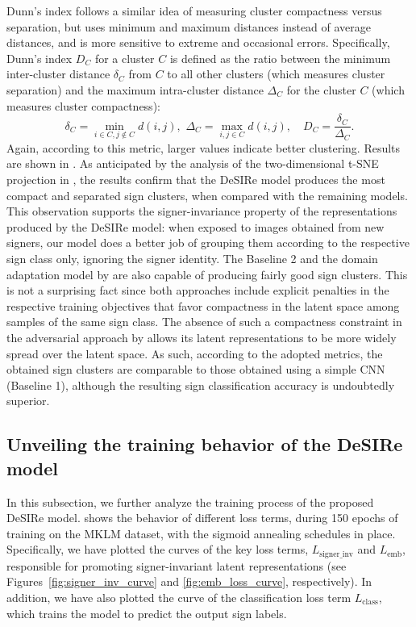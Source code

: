 Dunn's index follows a similar idea of measuring cluster compactness versus separation, but uses minimum and maximum distances instead of average distances, and is more sensitive to extreme and occasional errors. Specifically, Dunn's index $D_C$ for a cluster $C$ is defined as the ratio between the minimum inter-cluster distance $\delta_C$ from $C$ to all other clusters (which measures cluster separation) and the maximum intra-cluster distance $\Delta_C$ for the cluster $C$ (which measures cluster compactness):
\begin{equation}
    \delta_C = \min_{i \in C, j \not\in C} d(i,j), \,\, \Delta_C = \max_{i,j \in C} d(i,j), \quad  D_C = \frac{\delta_C}{\Delta_C}.
\end{equation}
Again, according to this metric, larger values indicate better clustering.
Results are shown in . As anticipated by the analysis of the two-dimensional t-SNE projection in , the results confirm that the DeSIRe model produces the most compact and separated sign clusters, when compared with the remaining models. This observation supports the signer-invariance property of the representations produced by the DeSIRe model: when exposed to images obtained from new signers, our model does a better job of grouping them according to the respective sign class only, ignoring the signer identity. The Baseline 2 and the domain adaptation model by \citet{Hu2016} are also capable of producing fairly good sign clusters. This is not a surprising fact since both approaches include explicit penalties in the respective training objectives that favor compactness in the latent space among samples of the same sign class. The absence of such a compactness constraint in the adversarial approach by \citet{Ganin2015} allows its latent representations to be more widely spread over the latent space. As such, according to the adopted metrics, the obtained sign clusters are comparable to those obtained using a simple CNN (Baseline 1), although the resulting sign classification accuracy is undoubtedly superior.

\subsection{Unveiling the training behavior of the DeSIRe model}
\label{sec:desire_training_behav}
In this subsection, we further analyze the training process of the proposed DeSIRe model.  shows the behavior of different loss terms, during 150 epochs of training on the MKLM dataset, with the sigmoid annealing schedules in place. Specifically, we have plotted the curves of the key loss terms, $L_{\text{signer\_inv}}$ and $L_{\text{emb}}$, responsible for promoting signer-invariant latent representations (see Figures~\ref{fig:signer_inv_curve} and \ref{fig:emb_loss_curve}, respectively). In addition, we have also plotted the curve of the classification loss term $L_{\text{class}}$, which trains the model to predict the output sign labels.

